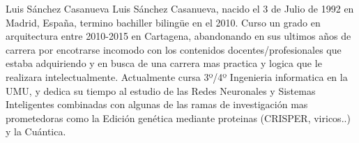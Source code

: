 \documentclass[10pt,journal,compsoc]{IEEEtran}
\begin{document}

%
%
%


\begin{IEEEbiographynophoto}{Luis Sánchez Casanueva}
Luis Sánchez Casanueva, nacido el 3 de Julio de 1992 en Madrid, España, termino bachiller bilingüe en el 2010.
Curso un grado en arquitectura entre 2010-2015 en Cartagena, abandonando en sus ultimos años de carrera por 
encotrarse incomodo con los contenidos docentes/profesionales que estaba adquiriendo y en busca de una carrera mas
practica y logica que le realizara intelectualmente.
Actualmente cursa 3º/4º Ingenieria informatica en la UMU, y dedica su tiempo al estudio de las Redes Neuronales y Sistemas 
Inteligentes combinadas con algunas de las ramas de investigación mas prometedoras como la Edición genética mediante proteinas (CRISPER, viricos..) y la Cuántica.
\end{IEEEbiographynophoto}


\end{document}
